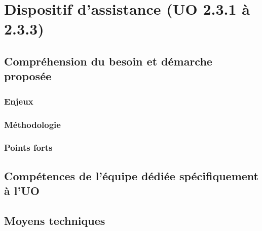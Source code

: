 	\section{Dispositif d'assistance (UO 2.3.1 à 2.3.3)}
	\subsection{Compréhension du besoin et démarche proposée}
	\subsubsection{Enjeux}
	\subsubsection{Méthodologie}
	\subsubsection{Points forts}
	\subsection{Compétences de l'équipe dédiée spécifiquement à l'UO}	
	\subsection{Moyens techniques}